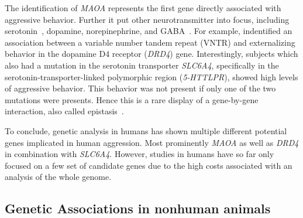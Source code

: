 The identification of \textit{MAOA} represents the first gene directly associated with aggressive behavior.
Further it put other neurotransmitter into focus, including serotonin~\cite{Murphy2008a}, dopamine, norepinephrine, and GABA~\cite{Marino2005a,Miczek2002a}.
For example, \citet{Hohmann2009a} indentified an association between a variable number tandem repeat (VNTR) and externalizing behavior in the dopamine D4 receptor (\textit{DRD4}) gene.
Interestingly, subjects which also had a mutation in the serotonin transporter \textit{SLC6A4}, specifically in the serotonin-transporter-linked polymorphic region (\textit{5-HTTLPR}), showed high levels of aggressive behavior.
This behavior was not present if only one of the two mutations were presents.
Hence this is a rare display of a gene-by-gene interaction, also called epistasis~\cite{Anholt2012}.

To conclude, genetic analysis in humans has shown multiple different potential genes implicated in human aggression.
Most prominently \textit{MAOA} as well as \textit{DRD4} in combination with \textit{SLC6A4}.
However, studies in humans have so far only focused on a few set of candidate genes due to the high costs associated with an analysis of the whole genome.

\subsection{Genetic Associations in nonhuman animals}
\label{sub:genetic_associations_in_animals}


